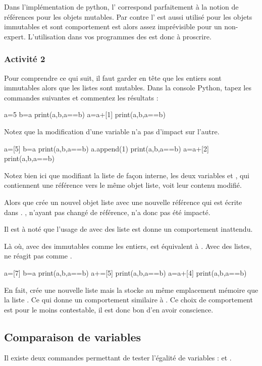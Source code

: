 \documentclass[11pt,a4paper,french,twoside]{PMCours}
\begin{document}
Dans l'implémentation de python, l' correspond parfaitement à la notion
de références pour les objets mutables. Par contre l' est aussi utilisé
pour les objets immutables et sont comportement est alors assez imprévisible
pour un non-expert. L'utilisation dans vos programmes des  est donc à
proscrire.

\subsubsection*{Activité 2}
Pour comprendre ce qui suit, il faut garder en tête que les entiers sont 
immutables alors que les listes sont mutables.
Dans la console Python, tapez les commandes suivantes et commentez les résultats :
\begin{Python}
a=5
b=a
print(a,b,a==b)
a=a+[1]
print(a,b,a==b)
\end{Python}
Notez que la modification d'une variable n'a pas d'impact sur l'autre.
\begin{Python}
a=[5]
b=a
print(a,b,a==b)
a.append(1)
print(a,b,a==b)
a=a+[2]
print(a,b,a==b)
\end{Python}
Notez bien ici que  modifiant la liste de façon interne, les 
deux variables  et , qui contiennent une référence vers le même
objet liste, voit leur contenu modifié.

Alors que  crée un nouvel objet liste avec une nouvelle référence
qui est écrite dans . , n'ayant pas changé de référence, n'a
donc pas été impacté.

\medskip
\warning{} Il est à noté que l'usage de \code{+=} avec des liste est donne un 
comportement inattendu.

Là où, avec des immutables comme les entiers,  est équivalent à
. Avec des listes,  ne réagit pas comme .
\begin{Python}
	a=[7]
	b=a
	print(a,b,a==b)
	a+=[5]
	print(a,b,a==b)
	a=a+[4]
	print(a,b,a==b)
\end{Python}
En fait,  crée une nouvelle liste mais la stocke au même
emplacement mémoire que la liste . Ce qui donne un comportement
similaire à . Ce choix de comportement est pour le moins
contestable, il est donc bon d'en avoir conscience.  


\subsection{Comparaison de variables}
Il existe deux commandes permettant de tester l'égalité de variables : \code{==} 
et .
\end{document}
